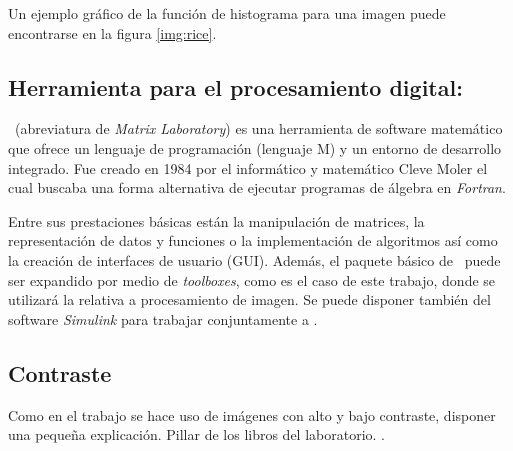 Un ejemplo gráfico de la función de histograma para una imagen puede encontrarse en la figura \ref{img:rice}.


\subsection{Herramienta para el procesamiento digital: \MATLAB}\label{sec:matlab}
\MATLAB\ (abreviatura de {\em Matrix Laboratory}) es una herramienta de software matemático que ofrece un lenguaje de programación (lenguaje M) y un entorno de desarrollo integrado. Fue creado en 1984 por el informático y matemático Cleve Moler el cual buscaba una forma alternativa de ejecutar programas de álgebra en {\em Fortran}.

Entre sus prestaciones básicas están la manipulación de matrices, la representación de datos y funciones o la implementación de algoritmos así como la creación de interfaces de usuario (GUI). Además, el paquete básico de \MATLAB\ puede ser expandido por medio de {\em toolboxes}, como es el caso de este trabajo, donde se utilizará la relativa  a procesamiento de imagen. Se puede disponer también del software {\em Simulink} para trabajar conjuntamente a \MATLAB.

\subsection{Contraste}
Como en el trabajo se hace uso de imágenes con alto y bajo contraste, disponer una pequeña explicación. Pillar de los libros del laboratorio. .

